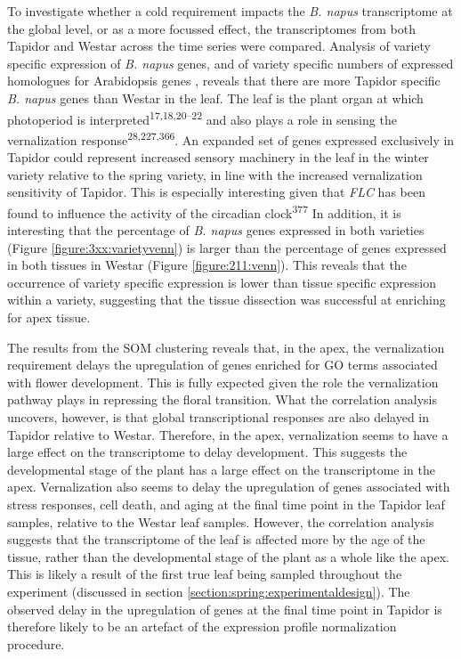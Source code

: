 \documentclass[12pt,]{book}
\begin{document}
To investigate whether a cold requirement impacts the \emph{B. napus}
transcriptome at the global level, or as a more focussed effect, the
transcriptomes from both Tapidor and Westar across the time series were
compared. Analysis of variety specific expression of \emph{B. napus}
genes, and of variety specific numbers of expressed homologues for
Arabidopsis genes , reveals that there are more Tapidor specific
\emph{B. napus} genes than Westar in the leaf. The leaf is the plant
organ at which photoperiod is interpreted\textsuperscript{17,18,20--22}
and also plays a role in sensing the vernalization
response\textsuperscript{28,227,366}. An expanded set of genes expressed
exclusively in Tapidor could represent increased sensory machinery in
the leaf in the winter variety relative to the spring variety, in line
with the increased vernalization sensitivity of Tapidor. This is
especially interesting given that \emph{FLC} has been found to influence
the activity of the circadian clock\textsuperscript{377} In addition, it
is interesting that the percentage of \emph{B. napus} genes expressed in
both varieties (Figure \ref{figure:3xx:varietyvenn}) is larger than the
percentage of genes expressed in both tissues in Westar (Figure
\ref{figure:211:venn}). This reveals that the occurrence of variety
specific expression is lower than tissue specific expression within a
variety, suggesting that the tissue dissection was successful at
enriching for apex tissue.

The results from the SOM clustering reveals that, in the apex, the
vernalization requirement delays the upregulation of genes enriched for
GO terms associated with flower development. This is fully expected
given the role the vernalization pathway plays in repressing the floral
transition. What the correlation analysis uncovers, however, is that
global transcriptional responses are also delayed in Tapidor relative to
Westar. Therefore, in the apex, vernalization seems to have a large
effect on the transcriptome to delay development. This suggests the
developmental stage of the plant has a large effect on the transcriptome
in the apex. Vernalization also seems to delay the upregulation of genes
associated with stress responses, cell death, and aging at the final
time point in the Tapidor leaf samples, relative to the Westar leaf
samples. However, the correlation analysis suggests that the
transcriptome of the leaf is affected more by the age of the tissue,
rather than the developmental stage of the plant as a whole like the
apex. This is likely a result of the first true leaf being sampled
throughout the experiment (discussed in section
\ref{section:spring:experimentaldesign}). The observed delay in the
upregulation of genes at the final time point in Tapidor is therefore
likely to be an artefact of the expression profile normalization
procedure.
\end{document}
